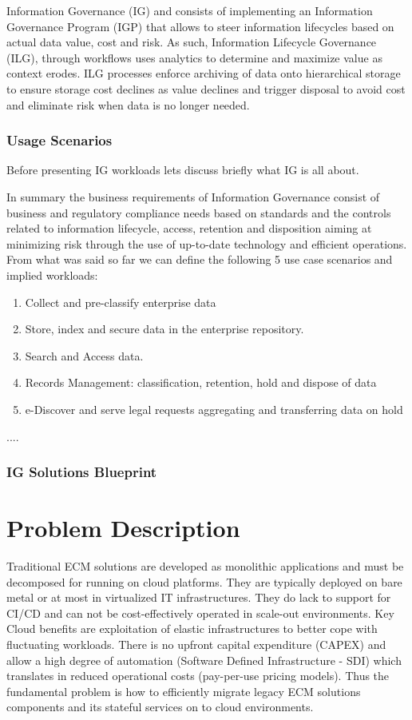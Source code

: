 \documentclass[runningheads]{llncs}
\begin{document}
Information Governance (IG) and consists of implementing an Information Governance Program (IGP) that allows to steer information lifecycles based on actual data value, cost and risk. As such, Information Lifecycle Governance (ILG), through workflows uses analytics to determine and maximize value as context erodes. ILG processes enforce archiving of data onto hierarchical storage to ensure storage cost declines as value declines and trigger disposal to avoid cost and eliminate risk when data is no longer needed.

\subsubsection{Usage Scenarios}
Before presenting IG workloads lets discuss briefly what IG is all about. 

In summary the business requirements of Information Governance consist of business and regulatory compliance needs based on standards and the controls related to information lifecycle, access, retention and disposition aiming at minimizing risk through the use of up-to-date technology and efficient operations. From what was said so far we can define the following 5 use case scenarios and implied workloads:

\begin{enumerate}
    \item Collect and pre-classify enterprise data 
    \item Store, index and secure data in the enterprise repository.
    \item Search and Access data.
    \item Records Management: classification, retention, hold and dispose of data
    \item e-Discover and serve legal requests aggregating and transferring data on hold
\end{enumerate}

....

\subsubsection{IG Solutions Blueprint}



 \section{Problem Description}

Traditional ECM solutions are developed as monolithic applications and must be decomposed for running on cloud platforms. They are typically deployed on bare metal or at most in virtualized IT infrastructures. They do lack to support for CI/CD and can not be cost-effectively operated in scale-out environments. Key Cloud benefits are exploitation of elastic infrastructures to better cope with fluctuating workloads. There is no upfront capital expenditure (CAPEX) and allow a 
high degree of automation (Software Defined Infrastructure - SDI) which translates in reduced operational costs (pay-per-use pricing models). Thus the fundamental problem is how to efficiently migrate legacy ECM solutions components and its stateful services on to cloud environments.
\end{document}
